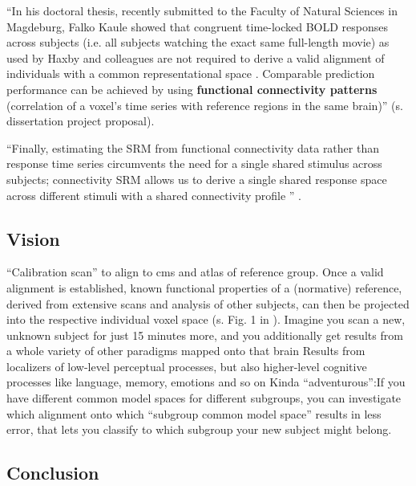 
``In his doctoral thesis, recently submitted to the Faculty of Natural Sciences
in Magdeburg, Falko Kaule showed that congruent time-locked BOLD responses
across subjects (i.e. all subjects watching the exact same full-length movie) as
used by Haxby and colleagues are not required to derive a valid alignment of
individuals with a common representational space \citep{kaule2017examination}.
%
Comparable prediction performance can be achieved by using \textbf{functional
connectivity patterns} (correlation of a voxel's time series with reference
regions in the same brain)'' (s. dissertation project proposal).


``Finally, estimating the SRM from functional connectivity
data rather than response time series circumvents the need for a single shared
stimulus across subjects; connectivity SRM allows us to derive a single shared
response space across different stimuli with a shared connectivity profile
\citep{nastase2019leveraging}'' \citep{kumar2020brainiak}.




\subsection{Vision}

``Calibration scan'' to align to \ac{cms} and atlas of reference group.
%
Once a valid alignment is established, known functional properties of a
(normative) reference, derived from extensive scans and analysis of other
subjects, can then be projected into the respective individual voxel space (s.
Fig. 1 in \citep{nishimoto2016lining}).
%
Imagine you scan a new, unknown subject for just 15 minutes more, and you
additionally get results from a whole variety of other paradigms mapped onto
that brain
%
Results from localizers of low-level perceptual processes, but also higher-level
cognitive processes like language, memory, emotions and so on
%
Kinda ``adventurous'':If you have different common model spaces for different
subgroups, you can investigate which alignment onto which ``subgroup common
model space'' results in less error, that lets you classify to which subgroup
your new subject might belong.


\subsection{Conclusion}
